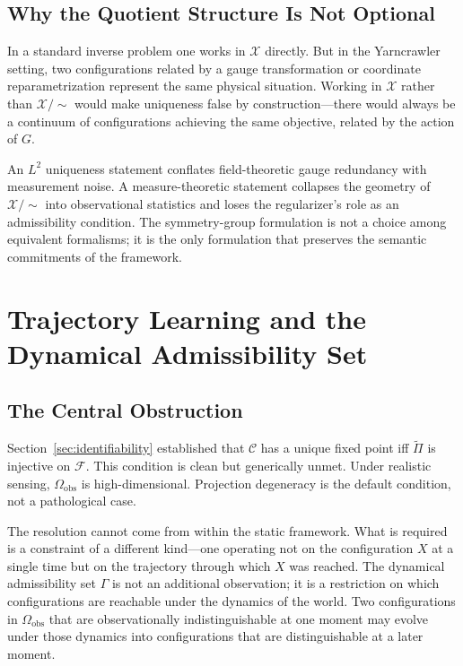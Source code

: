 \documentclass[12pt, oneside]{article}
\newcommand{\Xmod}{\mathcal{X}/{\sim}}
\newcommand{\Ftil}{\widetilde{\Pi}}
\begin{document}
\subsection{Why the Quotient Structure Is Not Optional}

In a standard inverse problem one works in $\mathcal{X}$ directly. But in the Yarncrawler
setting, two configurations related by a gauge transformation or coordinate
reparametrization represent the same physical situation. Working in $\mathcal{X}$ rather
than $\Xmod$ would make uniqueness false by construction---there would always be a
continuum of configurations achieving the same objective, related by the action of $G$.

An $L^2$ uniqueness statement conflates field-theoretic gauge redundancy with measurement
noise. A measure-theoretic statement collapses the geometry of $\Xmod$ into observational
statistics and loses the regularizer's role as an admissibility condition. The
symmetry-group formulation is not a choice among equivalent formalisms; it is the only
formulation that preserves the semantic commitments of the framework.

\section{Trajectory Learning and the Dynamical Admissibility Set}
\label{sec:disambiguation}

\subsection{The Central Obstruction}

Section~\ref{sec:identifiability} established that $\mathcal{C}$ has a unique fixed point
iff $\Ftil$ is injective on $\mathcal{F}$. This condition is clean but generically unmet.
Under realistic sensing, $\Omega_{\mathrm{obs}}$ is high-dimensional. Projection degeneracy
is the default condition, not a pathological case.

The resolution cannot come from within the static framework. What is required is a
constraint of a different kind---one operating not on the configuration $X$ at a single
time but on the trajectory through which $X$ was reached. The dynamical admissibility set
$\Gamma$ is not an additional observation; it is a restriction on which configurations are
reachable under the dynamics of the world. Two configurations in $\Omega_{\mathrm{obs}}$
that are observationally indistinguishable at one moment may evolve under those dynamics
into configurations that are distinguishable at a later moment.
\end{document}
